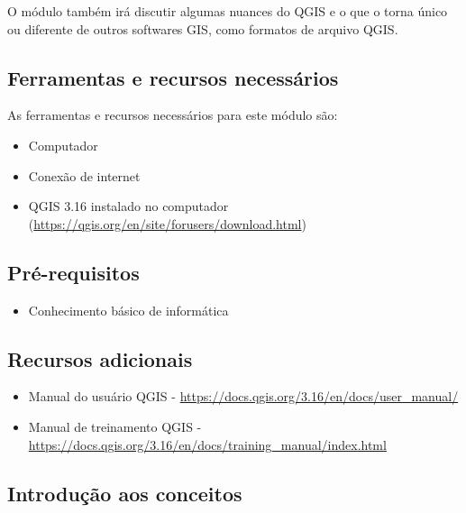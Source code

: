 \documentclass[
  portuguese,
]{krantz}
\providecommand{\tightlist}{%
  \setlength{\itemsep}{0pt}\setlength{\parskip}{0pt}}
\begin{document}
O módulo também irá discutir algumas nuances do QGIS e o que o torna único ou diferente de outros softwares GIS, como formatos de arquivo QGIS.

\hypertarget{ferramentas-e-recursos-necessuxe1rios-1}{%
\subsection{Ferramentas e recursos necessários}\label{ferramentas-e-recursos-necessuxe1rios-1}}

As ferramentas e recursos necessários para este módulo são:

\begin{itemize}
\tightlist
\item
  Computador
\item
  Conexão de internet
\item
  QGIS 3.16 instalado no computador (\url{https://qgis.org/en/site/forusers/download.html})
\end{itemize}

\hypertarget{pruxe9-requisitos-1}{%
\subsection{Pré-requisitos}\label{pruxe9-requisitos-1}}

\begin{itemize}
\tightlist
\item
  Conhecimento básico de informática
\end{itemize}

\hypertarget{recursos-adicionais-1}{%
\subsection{Recursos adicionais}\label{recursos-adicionais-1}}

\begin{itemize}
\tightlist
\item
  Manual do usuário QGIS - \url{https://docs.qgis.org/3.16/en/docs/user_manual/}
\item
  Manual de treinamento QGIS - \url{https://docs.qgis.org/3.16/en/docs/training_manual/index.html}
\end{itemize}

\hypertarget{introduuxe7uxe3o-aos-conceitos}{%
\subsection{Introdução aos conceitos}\label{introduuxe7uxe3o-aos-conceitos}}
\end{document}
